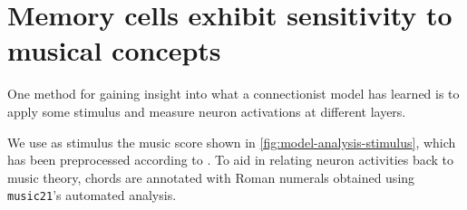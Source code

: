 \documentclass[dissertation.tex]{subfiles}
\begin{document}

\section{Memory cells exhibit sensitivity to musical concepts}

One method for gaining insight into what a connectionist model has learned is
to apply some stimulus and measure neuron activations at different layers.

We use as stimulus the music score shown in
\autoref{fig:model-analysis-stimulus}, which has been preprocessed according to
. To aid in relating neuron activities back to music
theory, chords are annotated with Roman numerals obtained using {\tt music21}'s
automated analysis.
\end{document}
